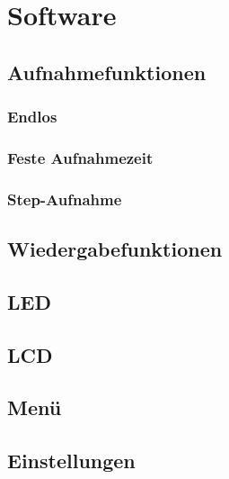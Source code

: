 \newpage
\section{Software}






\subsection{Aufnahmefunktionen}
\subsubsection{Endlos}
\subsubsection{Feste Aufnahmezeit}
\subsubsection{Step-Aufnahme}
\subsection{Wiedergabefunktionen}
\subsection{LED}
\subsection{LCD}

\subsection{Menü}
\subsection{Einstellungen}